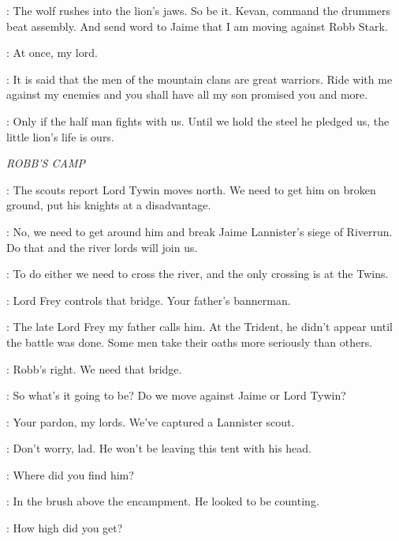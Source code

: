 \TYWIN: The wolf rushes into the lion's jaws. So be it. Kevan, command the drummers beat assembly.  And send word to Jaime that I am moving against Robb Stark. 

\PAGE: At once, my lord. 

\TYWIN:  It is said that the men of the mountain clans are great warriors. Ride with me against my enemies and you shall have all my son promised you and more. 

\SHAGGA: Only if the half man fights with us. Until we hold the steel he pledged us, the little lion's life is ours. 


\scene

\textit{ROBB'S CAMP} 


\RODRIK: The scouts report Lord Tywin moves north. We need to get him on broken ground, put his knights at a disadvantage. 

\UMBER: No, we need to get around him and break Jaime Lannister's siege of Riverrun. Do that and the river lords will join us. 

\ROBB: To do either we need to cross the river, and the only crossing is at the Twins. 

\THEON: Lord Frey controls that bridge. Your father's bannerman. 

\CATELYN: The late Lord Frey my father calls him. At the Trident, he didn't appear until the battle was done. Some men take their oaths more seriously than others. 

\THEON: Robb's right. We need that bridge. 

\UMBER: So what's it going to be? Do we move against Jaime or Lord Tywin? 


\STARKGUARD: Your pardon, my lords. We've captured a Lannister scout. 


\UMBER: Don't worry, lad. He won't be leaving this tent with his head. 

\ROBB: Where did you find him? 

\STARKGUARD: In the brush above the encampment. He looked to be counting. 

\ROBB:  How high did you get? 


